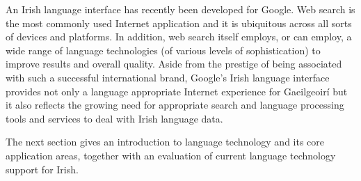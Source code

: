 \begin{multicols}{2}
An Irish language interface has recently been developed for Google. Web search is the most commonly used Internet application and it is ubiquitous across all sorts of devices and platforms. In addition, web search itself employs, or can employ, a wide range of language technologies (of various levels of sophistication) to improve results and overall quality. Aside from the prestige of being associated with such a successful international brand, Google’s Irish language interface provides not only a language appropriate Internet experience for Gaeilgeoirí but it also reflects the growing need for appropriate search and language processing tools and services to deal with Irish language data.

The next section gives an introduction to language technology and its core application areas, together with an evaluation of current language technology support for Irish.

\end{multicols}
\clearpage

\label{LTforIrish_en}

